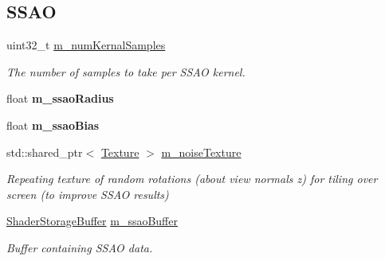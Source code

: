 \subsection*{S\+S\+AO}
\begin{DoxyCompactItemize}
\item 
\mbox{\label{classrev_1_1_lighting_settings_ad154c45c95c7afc1bb5c78ab08516713}} 
uint32\+\_\+t \mbox{\hyperlink{classrev_1_1_lighting_settings_ad154c45c95c7afc1bb5c78ab08516713}{m\+\_\+num\+Kernal\+Samples}}
\begin{DoxyCompactList}\small\item\em The number of samples to take per S\+S\+AO kernel. \end{DoxyCompactList}\item 
\mbox{\label{classrev_1_1_lighting_settings_a8a6080b1d7c88ec69db80addafdc7a5f}} 
float {\bfseries m\+\_\+ssao\+Radius}
\item 
\mbox{\label{classrev_1_1_lighting_settings_a74a8a2ce06b7e422fc0ad772ca79e52a}} 
float {\bfseries m\+\_\+ssao\+Bias}
\item 
\mbox{\label{classrev_1_1_lighting_settings_ac9e0cd27f2e9ec078e5bfc521be78229}} 
std\+::shared\+\_\+ptr$<$ \mbox{\hyperlink{classrev_1_1_texture}{Texture}} $>$ \mbox{\hyperlink{classrev_1_1_lighting_settings_ac9e0cd27f2e9ec078e5bfc521be78229}{m\+\_\+noise\+Texture}}
\begin{DoxyCompactList}\small\item\em Repeating texture of random rotations (about view normal\textquotesingle{}s z) for tiling over screen (to improve S\+S\+AO results) \end{DoxyCompactList}\item 
\mbox{\hyperlink{classrev_1_1_shader_storage_buffer}{Shader\+Storage\+Buffer}} \mbox{\hyperlink{classrev_1_1_lighting_settings_a9264e10cb4df67df2f04edd37dd87d25}{m\+\_\+ssao\+Buffer}}
\begin{DoxyCompactList}\small\item\em Buffer containing S\+S\+AO data. \end{DoxyCompactList}\item 
\mbox{\label{classrev_1_1_lighting_settings_adf0d3516709226e6ddf1c2566beb0f58}} 

\end{DoxyCompactItemize}
